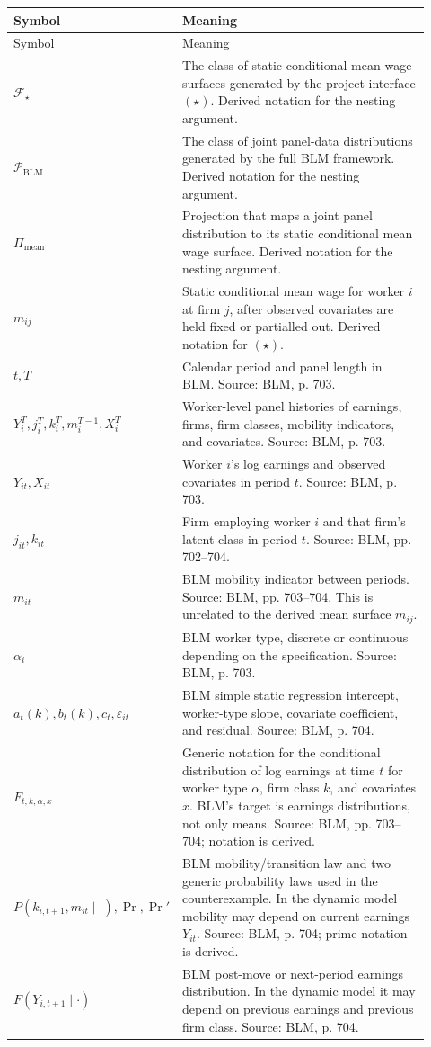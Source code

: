 ﻿\documentclass[11pt]{article}
\newcommand{\1}{\mathbf{1}}
\begin{document}
\begin{longtable}{>{\raggedright\arraybackslash}p{0.24\linewidth}
                >{\raggedright\arraybackslash}p{0.68\linewidth}}
\toprule
Symbol & Meaning \\
\midrule
\endfirsthead
\toprule
Symbol & Meaning \\
\midrule
\endhead
$\mathcal F_\star$ & The class of static conditional mean wage surfaces generated by the project interface $(\star)$. Derived notation for the nesting argument. \\
$\mathcal P_{\mathrm{BLM}}$ & The class of joint panel-data distributions generated by the full BLM framework. Derived notation for the nesting argument. \\
$\Pi_{\mathrm{mean}}$ & Projection that maps a joint panel distribution to its static conditional mean wage surface. Derived notation for the nesting argument. \\
$m_{ij}$ & Static conditional mean wage for worker $i$ at firm $j$, after observed covariates are held fixed or partialled out. Derived notation for $(\star)$. \\
$t,T$ & Calendar period and panel length in BLM. Source: BLM, p. 703. \\
$Y_i^T,j_i^T,k_i^T,m_i^{T-1},X_i^T$ & Worker-level panel histories of earnings, firms, firm classes, mobility indicators, and covariates. Source: BLM, p. 703. \\
$Y_{it},X_{it}$ & Worker $i$'s log earnings and observed covariates in period $t$. Source: BLM, p. 703. \\
$j_{it},k_{it}$ & Firm employing worker $i$ and that firm's latent class in period $t$. Source: BLM, pp. 702--704. \\
$m_{it}$ & BLM mobility indicator between periods. Source: BLM, pp. 703--704. This is unrelated to the derived mean surface $m_{ij}$. \\
$\alpha_i$ & BLM worker type, discrete or continuous depending on the specification. Source: BLM, p. 703. \\
$a_t(k),b_t(k),c_t,\varepsilon_{it}$ & BLM simple static regression intercept, worker-type slope, covariate coefficient, and residual. Source: BLM, p. 704. \\
$F_{t,k,\alpha,x}$ & Generic notation for the conditional distribution of log earnings at time $t$ for worker type $\alpha$, firm class $k$, and covariates $x$. BLM's target is earnings distributions, not only means. Source: BLM, pp. 703--704; notation is derived. \\
$P(k_{i,t+1},m_{it}\mid\cdot),\Pr,\Pr'$ & BLM mobility/transition law and two generic probability laws used in the counterexample. In the dynamic model mobility may depend on current earnings $Y_{it}$. Source: BLM, p. 704; prime notation is derived. \\
$F(Y_{i,t+1}\mid\cdot)$ & BLM post-move or next-period earnings distribution. In the dynamic model it may depend on previous earnings and previous firm class. Source: BLM, p. 704. \\
\bottomrule
\end{longtable}
\end{document}
